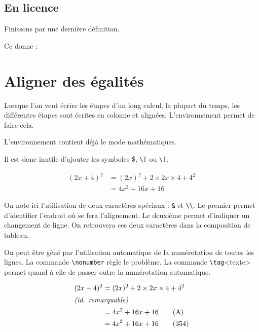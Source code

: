 \subsection{En licence}

Finissons par une dernière définition.


Ce  donne :




\section{Aligner des égalités}

Lorsque l'on veut écrire les étapes d'un long calcul, la plupart du temps, les différentes étapes sont écrites en colonne et alignées. L'environnement  permet de faire cela.

\danger L'environnement  contient déjà le mode \og mathématiques\fg{}.

Il est donc inutile d'ajouter les symboles \$, \verb!\[! ou \verb!\]!.
\bigskip

{
\begin{SideBySideExample}
    \begin{align}
        (2x+4)^2&=(2x)^2+2\times 2x\times 4+4^2 \\
                &=4x^2+16x+16
    \end{align}
\end{SideBySideExample}
}\bigskip

On note ici l'utilisation de deux caractères spéciaux : \verb!&! et \verb!\\!. Le premier permet d'identifier l'endroit où se fera l'alignement. Le deuxième permet d'indiquer un changement de ligne. On retrouvera ces deux caractères dans la composition de tableau.

On peut être gêné par l'utilisation automatique de la numérotation de toutes les lignes. La commande \texttt{\textbackslash nonumber} règle le problème. La commande \texttt{\textbackslash tag}<texte> permet quand à elle de passer outre la numérotation automatique.\bigskip

{
\begin{SideBySideExample}
    \begin{align}
        (2x+4)^2&=(2x)^2+2\times 2x\times 4
                           + 4^2\nonumber\\
        \shortintertext{\textit{(id. remarquable)}}
                &=4x^2+16x+16 \tag{A} \\
                &=4x^2+16x+16 \tag{354}
    \end{align}
\end{SideBySideExample}
}\bigskip

